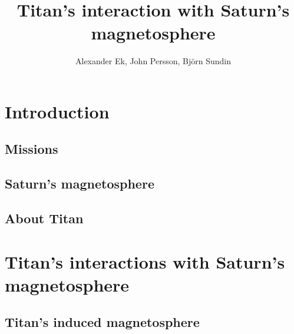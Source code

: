 \documentclass[12pt, titlepage, parskip=full*]{scrartcl}
\title{Titan's interaction with Saturn's magnetosphere}
\author{Alexander Ek, John Persson, Björn Sundin}
\begin{document}
\maketitle

\tableofcontents
\newpage

\section{Introduction}
\subsection{Missions}
\subsection{Saturn's magnetosphere}

\subsection{About Titan}


\section{Titan's interactions with Saturn's magnetosphere}

\subsection{Titan's induced magnetosphere}


\parencite{solar-system-magnetospheres}



\printbibliography
\end{document}
